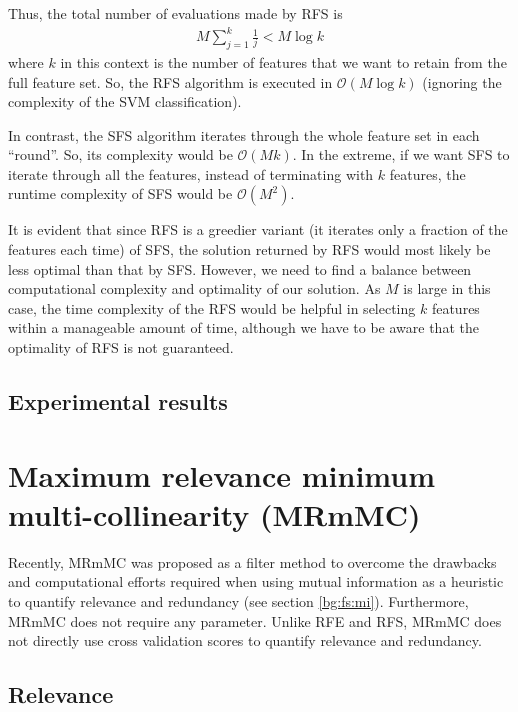 \documentclass[12pt, twoside, a4paper]{report}
\begin{document}
Thus, the total number of evaluations made by RFS is
\begin{align*}
M \sum_{j=1}^k \frac{1}{j} < M \log k
\end{align*}
where $k$ in this context is the number of features that we want to retain from the full feature set. So, the RFS algorithm is executed in $\mathcal{O}(M\log k)$ (ignoring the complexity of the SVM classification).

In contrast, the SFS algorithm iterates through the whole feature set in each ``round''. So, its complexity would be $\mathcal{O}(Mk)$. In the extreme, if we want SFS to iterate through all the features, instead of terminating with $k$ features, the runtime complexity of SFS would be $\mathcal{O}(M^2)$.

It is evident that since RFS is a greedier variant (it iterates only a fraction of the features each time) of SFS, the solution returned by RFS would most likely be less optimal than that by SFS. However, we need to find a balance between computational complexity and optimality of our solution. As $M$ is large in this case, the time complexity of the RFS would be helpful in selecting $k$ features within a manageable amount of time, although we have to be aware that the optimality of RFS is not guaranteed.

\subsection{Experimental results}


\section{Maximum relevance minimum multi-collinearity (MRmMC)} \label{mrmmc}

Recently, MRmMC \cite{RefWorks:187} was proposed as a filter method to overcome the drawbacks and computational efforts required when using mutual information as a heuristic to quantify relevance and redundancy (see section \ref{bg:fs:mi}). Furthermore, MRmMC does not require any parameter. Unlike RFE and RFS, MRmMC does not directly use cross validation scores to quantify relevance and redundancy. 

\subsection{Relevance}
\end{document}
